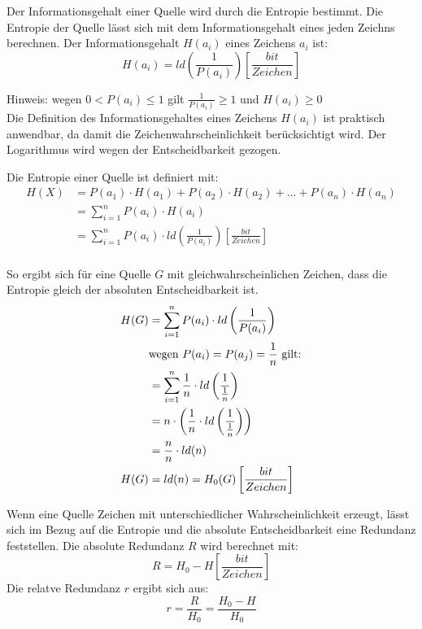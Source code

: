 Der Informationsgehalt einer Quelle wird durch die Entropie bestimmt. Die Entropie der Quelle lässt sich mit dem Informationsgehalt eines jeden Zeichns berechnen. Der Informationsgehalt $H(a_i)$ eines Zeichens $a_i$ ist:
$$ 
	H(a_i) = ld \left( \frac{1}{P(a_i)} \right) \left[ \frac{bit}{Zeichen} \right]
$$

Hinweis: wegen $0 < P(a_i) \le 1$ gilt $\frac{1}{P(a_i)} \ge 1$ und $H(a_i) \ge 0$ \\
Die Definition des Informationsgehaltes eines Zeichens $H(a_i)$ ist praktisch anwendbar, da damit die Zeichenwahrscheinlichkeit berücksichtigt wird. Der Logarithmus wird wegen der Entscheidbarkeit gezogen.

Die Entropie einer Quelle ist definiert mit:
\begin{align*}
	H(X) &= P(a_1) \cdot H(a_1) + P(a_2) \cdot H(a_2) + \ldots + P(a_n) \cdot H(a_n) \\
	     &= \sum_{i=1}^n P(a_i) \cdot H(a_i) \\
	     &= \sum_{i=1}^n P(a_i) \cdot ld \left( \frac{1}{P(a_i)} \right) \left[ \frac{bit}{Zeichen} \right]\\
\end{align*}

So ergibt sich für eine Quelle $G$ mit gleichwahrscheinlichen Zeichen, dass die Entropie gleich der absoluten Entscheidbarkeit ist.
\begin{align*}
	H(G) &= \sum_{i=1}^n P(a_i) \cdot ld \left( \frac{1}{P(a_i)} \right) \\
	     & \textnormal{wegen } P(a_i) = P(a_j) = \frac{1}{n} \textnormal{ gilt:} \\
	     &= \sum_{i=1}^n \frac{1}{n} \cdot ld \left( \frac{1}{\frac{1}{n}} \right) \\
	     &= n \cdot \left( \frac{1}{n} \cdot ld \left( \frac{1}{\frac{1}{n}} \right) \right)\\
	     &= \frac{n}{n} \cdot ld(n) \\
	H(G) &= ld(n) = H_0(G) \left[ \frac{bit}{Zeichen} \right]\\
\end{align*}

Wenn eine Quelle Zeichen mit unterschiedlicher Wahrscheinlichkeit erzeugt,
lässt sich im Bezug auf die Entropie und die absolute Entscheidbarkeit eine Redundanz feststellen.
Die absolute Redundanz $R$ wird berechnet mit:
$$
	R = H_0 - H \left[ \frac{bit}{Zeichen} \right]
$$
Die relatve Redundanz $r$ ergibt sich aus:
$$
	r = \frac{R}{H_0} = \frac{H_0 - H}{H_0}
$$

